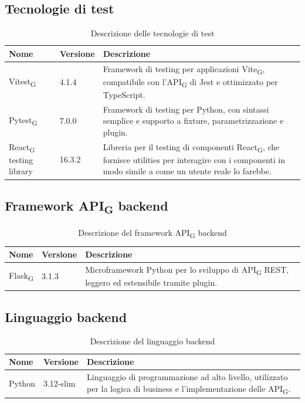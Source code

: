 \documentclass[11pt,a4paper]{article}
\newcommand{\gls}[1]{#1\textsubscript{G}}
\begin{document}
\subsection{Tecnologie di test}
\begin{table}[H]
    \centering
    \begin{tabular}{|p{}|p{}|p{}|}
        \hline
        \textbf{Nome} & \textbf{Versione} & \textbf{Descrizione} \\
        \hline
        \gls{Vitest} & 4.1.4 & Framework di testing per applicazioni \gls{Vite}, compatibile con l'\gls{API} di Jest e ottimizzato per TypeScript. \\
        \hline
        \gls{Pytest} & 7.0.0 & Framework di testing per Python, con sintassi semplice e supporto a fixture, parametrizzazione e plugin. \\
        \hline
        \gls{React} testing library & 16.3.2 & Libreria per il testing di componenti \gls{React}, che fornisce utilities per interagire con i componenti in modo simile a come un utente reale lo farebbe. \\
        \hline
    \end{tabular}
    \caption{Descrizione delle tecnologie di test}
    \label{tab:tecnologie_test}
\end{table}

\subsection{Framework \gls{API} backend}
\begin{table}[H]
    \centering
    \begin{tabular}{|p{}|p{}|p{}|}
        \hline
        \textbf{Nome} & \textbf{Versione} & \textbf{Descrizione} \\
        \hline
        \gls{Flask} & 3.1.3 & Microframework Python per lo sviluppo di \gls{API} REST, leggero ed estensibile tramite plugin. \\
        \hline
    \end{tabular}
    \caption{Descrizione del framework \gls{API} backend}
    \label{tab:api_backend}
\end{table}

\subsection{Linguaggio backend}
\begin{table}[H]
    \centering
    \begin{tabular}{|p{}|p{}|p{}|}
        \hline
        \textbf{Nome} & \textbf{Versione} & \textbf{Descrizione} \\
        \hline
        Python & 3.12-slim & Linguaggio di programmazione ad alto livello, utilizzato per la logica di business e l'implementazione delle \gls{API}. \\
        \hline
    \end{tabular}
    \caption{Descrizione del linguaggio backend}
    \label{tab:linguaggio_backend}
\end{table}
\end{document}
